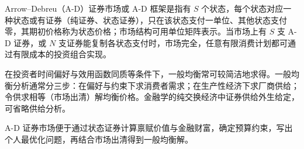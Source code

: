 

\begin{tcolorbox}[summary,title=本章小结]
Arrow--Debreu（A-D）证券市场或 A-D 框架是指有 $S$ 个状态，每个状态对应一种状态或有证券（纯证券、状态证券），只在该状态支付一单位、其他状态支付零，其期初价格称为状态价格；市场结构可用单位矩阵表示。当市场上有 $S$ 支 A-D 证券，或 $N$ 支证券能复制各状态支付时，市场完全，任意有限消费计划都可通过有限成本的投资组合实现。

在投资者时间偏好与效用函数同质等条件下，一般均衡常可较简洁地求得。一般均衡分析通常分三步：在偏好与约束下求消费者需求；在生产性经济下求厂商供给；令供求相等（市场出清）解均衡价格。金融学的纯交换经济中证券供给外生给定，可省略供给分析。

A-D 证券市场便于通过状态证券计算禀赋价值与金融财富，确定预算约束，写出个人最优化问题，再结合市场出清得到一般均衡解。
\end{tcolorbox}



